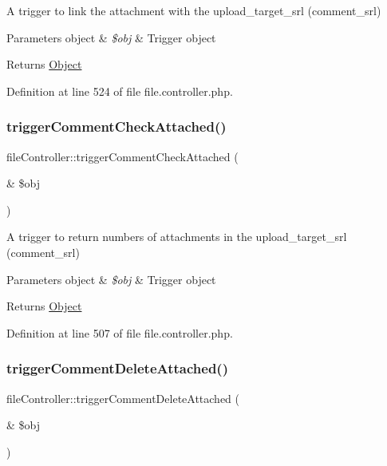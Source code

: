 A trigger to link the attachment with the upload\+\_\+target\+\_\+srl (comment\+\_\+srl)


\begin{DoxyParams}[1]{Parameters}
object & {\em \$obj} & Trigger object \\
\hline
\end{DoxyParams}
\begin{DoxyReturn}{Returns}
\hyperlink{classObject}{Object} 
\end{DoxyReturn}


Definition at line 524 of file file.\+controller.\+php.

\hypertarget{classfileController_a6076133ce2b8d0c025c54547fbc9cc37}{}\label{classfileController_a6076133ce2b8d0c025c54547fbc9cc37} 
\subsubsection{\texorpdfstring{trigger\+Comment\+Check\+Attached()}{triggerCommentCheckAttached()}}
{\footnotesize\ttfamily file\+Controller\+::trigger\+Comment\+Check\+Attached (\begin{DoxyParamCaption}\item[{\&}]{\$obj }\end{DoxyParamCaption})}

A trigger to return numbers of attachments in the upload\+\_\+target\+\_\+srl (comment\+\_\+srl)


\begin{DoxyParams}[1]{Parameters}
object & {\em \$obj} & Trigger object \\
\hline
\end{DoxyParams}
\begin{DoxyReturn}{Returns}
\hyperlink{classObject}{Object} 
\end{DoxyReturn}


Definition at line 507 of file file.\+controller.\+php.

\hypertarget{classfileController_ae1011288af2b3a2aca5bc4db41b9ad09}{}\label{classfileController_ae1011288af2b3a2aca5bc4db41b9ad09} 
\subsubsection{\texorpdfstring{trigger\+Comment\+Delete\+Attached()}{triggerCommentDeleteAttached()}}
{\footnotesize\ttfamily file\+Controller\+::trigger\+Comment\+Delete\+Attached (\begin{DoxyParamCaption}\item[{\&}]{\$obj }\end{DoxyParamCaption})}

